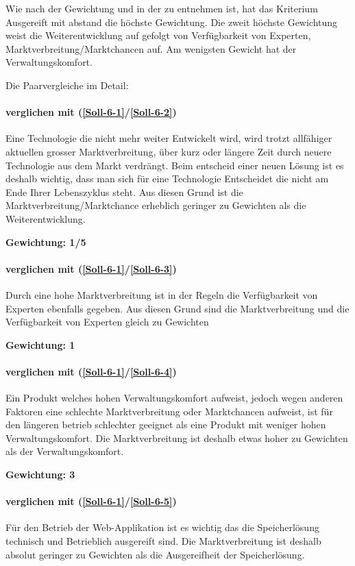 Wie nach der Gewichtung und in der  zu entnehmen ist, hat das Kriterium Ausgereift mit abstand die höchste Gewichtung. Die zweit höchste Gewichtung weist die Weiterentwicklung auf gefolgt von Verfügbarkeit von Experten, Marktverbreitung/Marktchancen auf. Am wenigsten Gewicht hat der Verwaltungskomfort.

Die Paarvergleiche im Detail:


\paragraph*{ verglichen mit  (\ref{Soll-6-1}/\ref{Soll-6-2})}Eine Technologie die nicht mehr weiter Entwickelt wird, wird trotzt allfähiger aktuellen grosser Marktverbreitung, über kurz oder längere Zeit durch neuere Technologie aus dem Markt verdrängt. Beim entscheid einer neuen Lösung ist es deshalb wichtig, dass man sich für eine Technologie Entscheidet die nicht am Ende Ihrer Lebenszyklus steht. Aus diesen Grund ist die Marktverbreitung/Marktchance erheblich geringer zu Gewichten als die Weiterentwicklung.

\textbf{Gewichtung: 1/5}


\paragraph*{ verglichen mit  (\ref{Soll-6-1}/\ref{Soll-6-3})}
Durch eine hohe Marktverbreitung ist in der Regeln die Verfügbarkeit von Experten ebenfalls gegeben. Aus diesen Grund sind die Marktverbreitung und die Verfügbarkeit von Experten gleich zu Gewichten

\textbf{Gewichtung: 1}

\paragraph*{ verglichen mit  (\ref{Soll-6-1}/\ref{Soll-6-4})}
Ein Produkt welches hohen Verwaltungskomfort aufweist, jedoch wegen anderen Faktoren eine schlechte Marktverbreitung oder Marktchancen aufweist, ist für den längeren betrieb schlechter geeignet als eine Produkt mit weniger hohen Verwaltungskomfort. Die Marktverbreitung ist deshalb etwas hoher zu Gewichten als der Verwaltungskomfort.

\textbf{Gewichtung: 3}

\paragraph*{ verglichen mit  (\ref{Soll-6-1}/\ref{Soll-6-5})}
Für den Betrieb der Web-Applikation ist es wichtig das die Speicherlösung technisch und Betrieblich ausgereift sind. Die Marktverbreitung ist deshalb absolut geringer zu Gewichten als die Ausgereifheit der Speicherlösung.


